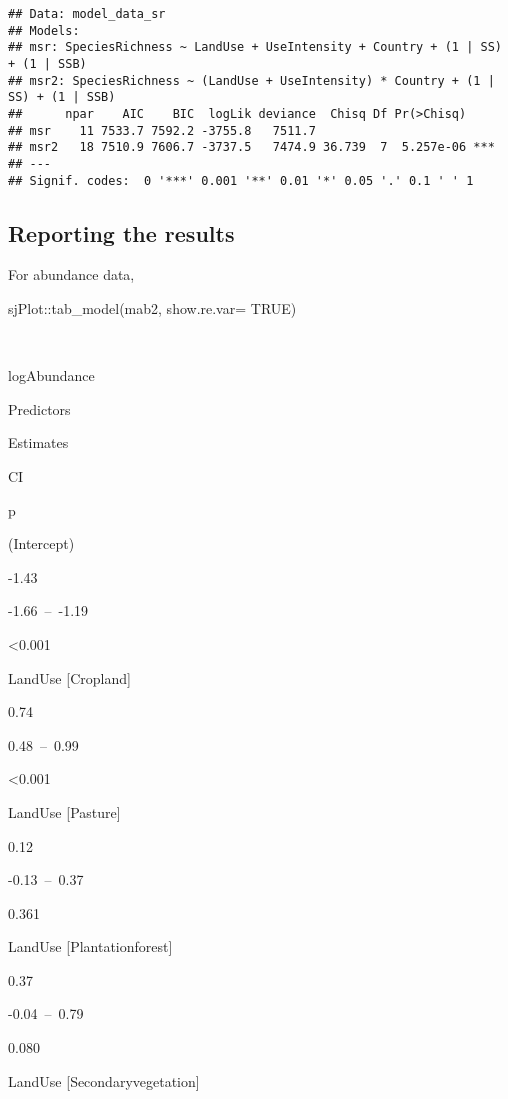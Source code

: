 \documentclass[
]{article}
\newenvironment{Shaded}{\begin{snugshade}}{\end{snugshade}}
\newcommand{\AttributeTok}[1]{\textcolor[rgb]{0.77,0.63,0.00}{#1}}
\newcommand{\ConstantTok}[1]{\textcolor[rgb]{0.00,0.00,0.00}{#1}}
\newcommand{\FunctionTok}[1]{\textcolor[rgb]{0.00,0.00,0.00}{#1}}
\newcommand{\NormalTok}[1]{#1}
\newcommand{\SpecialCharTok}[1]{\textcolor[rgb]{0.00,0.00,0.00}{#1}}
\begin{document}
\begin{verbatim}
## Data: model_data_sr
## Models:
## msr: SpeciesRichness ~ LandUse + UseIntensity + Country + (1 | SS) + (1 | SSB)
## msr2: SpeciesRichness ~ (LandUse + UseIntensity) * Country + (1 | SS) + (1 | SSB)
##      npar    AIC    BIC  logLik deviance  Chisq Df Pr(>Chisq)    
## msr    11 7533.7 7592.2 -3755.8   7511.7                         
## msr2   18 7510.9 7606.7 -3737.5   7474.9 36.739  7  5.257e-06 ***
## ---
## Signif. codes:  0 '***' 0.001 '**' 0.01 '*' 0.05 '.' 0.1 ' ' 1
\end{verbatim}

\hypertarget{reporting-the-results}{%
\subsection{Reporting the results}\label{reporting-the-results}}

For abundance data,

\begin{Shaded}
\begin{Highlighting}[]
\NormalTok{sjPlot}\SpecialCharTok{::}\FunctionTok{tab\_model}\NormalTok{(mab2, }
                  \AttributeTok{show.re.var=} \ConstantTok{TRUE}\NormalTok{)}
\end{Highlighting}
\end{Shaded}

~

logAbundance

Predictors

Estimates

CI

p

(Intercept)

-1.43

-1.66~--~-1.19

\textless0.001

LandUse {[}Cropland{]}

0.74

0.48~--~0.99

\textless0.001

LandUse {[}Pasture{]}

0.12

-0.13~--~0.37

0.361

LandUse {[}Plantationforest{]}

0.37

-0.04~--~0.79

0.080

LandUse {[}Secondaryvegetation{]}
\end{document}
